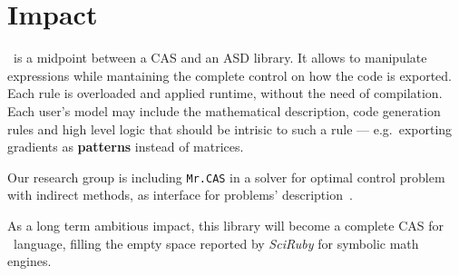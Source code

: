 
\section{Impact}
\label{sec:impact}

\ragnicas~is a midpoint between a CAS and an ASD library. It allows to manipulate expressions while mantaining the complete control on how the code is exported. Each rule is overloaded and applied runtime, without the need of compilation. Each user's model may include the mathematical description, code generation rules and high level logic that should be intrisic to such a rule --- e.g.~exporting gradients as \textbf{patterns} instead of matrices.

Our research group is including \texttt{Mr.CAS} in a solver for optimal control problem with indirect methods, as interface for problems' description~\cite{biral2016notes}.

As a long term ambitious impact, this library will become a complete CAS for \Ruby~language, filling the empty space reported by \emph{SciRuby} for symbolic math engines.
